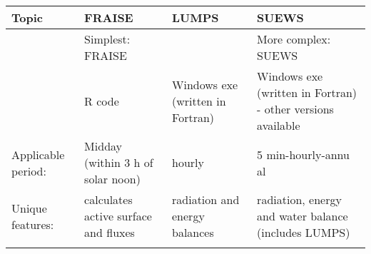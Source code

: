 \documentclass[letterpaper,10pt,english]{sphinxmanual}
\begin{document}
\begin{savenotes}\sphinxattablestart
\centering
\begin{tabulary}{\linewidth}[t]{|T|T|T|T|}
\hline
\sphinxstyletheadfamily 
Topic
&\sphinxstyletheadfamily 
FRAISE
&\sphinxstyletheadfamily 
LUMPS
&\sphinxstyletheadfamily 
SUEWS
\\
\hline
{}
&
Simplest:
FRAISE
&&
More complex:
SUEWS
\\
\hline
{}
&
R code
&
Windows exe
(written in
Fortran)
&
Windows exe
(written in
Fortran) -
other versions
available
\\
\hline
Applicable
period:
&
Midday (within
3 h of solar
noon)
&
hourly
&
5
min-hourly-annu
al
\\
\hline
Unique
features:
&
calculates
active surface
\textendash{} and fluxes
&
radiation and
energy balances
&
radiation,
energy and
water balance
(includes
LUMPS)
\\
\hline&&&\\
\hline
\end{tabulary}
\par
\sphinxattableend\end{savenotes}

\cleardoublepage
\begingroup
\renewcommand\chapter[1]{\endgroup}
\end{document}
